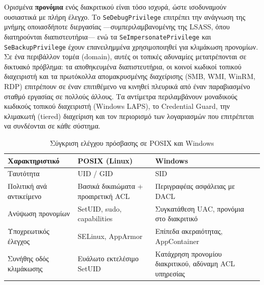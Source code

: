 \documentclass[11pt,openany]{book}
\begin{document}
Ορισμένα \textbf{προνόμια} ενός διακριτικού είναι τόσο ισχυρά, ώστε ισοδυναμούν ουσιαστικά με πλήρη έλεγχο. Το \texttt{SeDebugPrivilege} επιτρέπει την ανάγνωση της μνήμης οποιασδήποτε διεργασίας —συμπεριλαμβανομένης της LSASS, όπου διατηρούνται διαπιστευτήρια— ενώ τα \texttt{SeImpersonatePrivilege} και \texttt{SeBackupPrivilege} έχουν επανειλημμένα χρησιμοποιηθεί για κλιμάκωση προνομίων. Σε ένα περιβάλλον τομέα (domain), αυτές οι τοπικές αδυναμίες μετατρέπονται σε δικτυακό πρόβλημα: τα αποθηκευμένα διαπιστευτήρια, οι κοινοί κωδικοί τοπικού διαχειριστή και τα πρωτόκολλα απομακρυσμένης διαχείρισης (SMB, WMI, WinRM, RDP) επιτρέπουν σε έναν επιτιθέμενο να κινηθεί πλευρικά από έναν παραβιασμένο σταθμό εργασίας σε πολλούς άλλους. Τα αντίμετρα περιλαμβάνουν μοναδικούς κωδικούς τοπικού διαχειριστή (Windows LAPS), το Credential Guard, την κλιμακωτή (tiered) διαχείριση και τον περιορισμό των λογαριασμών που επιτρέπεται να συνδέονται σε κάθε σύστημα.

\begin{table}[htbp]
  \centering\small
  \caption{Σύγκριση ελέγχου πρόσβασης σε POSIX και Windows}
  \begin{tabularx}{\linewidth}{>{\raggedright\arraybackslash}X >{\raggedright\arraybackslash}X >{\raggedright\arraybackslash}X}
    \toprule
    \textbf{Χαρακτηριστικό} & \textbf{POSIX (Linux)} & \textbf{Windows} \\
    \midrule
    Ταυτότητα & UID / GID & SID \\
    Πολιτική ανά αντικείμενο & Βασικά δικαιώματα + προαιρετική ACL & Περιγραφέας ασφάλειας με DACL \\
    Ανύψωση προνομίων & SetUID, sudo, capabilities & Συγκατάθεση UAC, προνόμια στο διακριτικό \\
    Υποχρεωτικός έλεγχος & SELinux, AppArmor & Επίπεδα ακεραιότητας, AppContainer \\
    Συνήθης οδός κλιμάκωσης & Ευάλωτο εκτελέσιμο SetUID & Κατάχρηση προνομίου διακριτικού, αδύναμη ACL υπηρεσίας \\
    \bottomrule
  \end{tabularx}
\end{table}
\end{document}
